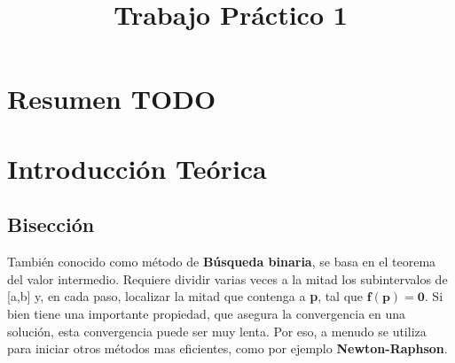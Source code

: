\documentclass[a4paper]{article}
\title{Trabajo Práctico 1}
\begin{document}
\maketitle
\newpage

\tableofcontents


\newpage
\section{Resumen TODO}

\section{Introducción Teórica}
\subsection{Bisección}
También conocido como método de \textbf{Búsqueda binaria}, se basa en el teorema del valor intermedio. 
Requiere dividir varias veces a la mitad los subintervalos de [a,b] y, en cada paso, localizar la mitad que 
contenga a \textbf{p}, tal que $\mathbf{f(p) = 0}$.
Si bien tiene una importante propiedad, que asegura la convergencia en una solución, 
esta convergencia puede ser muy lenta. 
Por eso, a menudo se utiliza para iniciar otros métodos mas eficientes, como por ejemplo \textbf{Newton-Raphson}.
\end{document}
